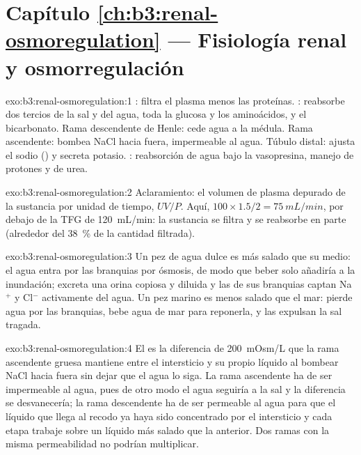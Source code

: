 \section*{Capítulo \ref{ch:b3:renal-osmoregulation} --- Fisiología renal y osmorregulación}

\begin{solution}{exo:b3:renal-osmoregulation:1}
: filtra el plasma menos las proteínas. :
reabsorbe dos tercios de la sal y del agua, toda la glucosa y los
aminoácidos, y el bicarbonato. Rama descendente de Henle: cede agua a
la médula. Rama ascendente: bombea NaCl hacia fuera, impermeable al
agua. Túbulo distal: ajusta el sodio () y secreta potasio.
: reabsorción de agua bajo la vasopresina, manejo de
protones y de urea.
\end{solution}

\begin{solution}{exo:b3:renal-osmoregulation:2}
Aclaramiento: el volumen de plasma depurado de la sustancia por unidad
de tiempo, $UV/P$. Aquí, $100\times 1.5/2 = \qty{75}{mL/min}$, por
debajo de la TFG de \qty{120}{mL/min}: la sustancia se filtra y se
reabsorbe en parte (alrededor del \qty{38}{\%} de la cantidad
filtrada).
\end{solution}

\begin{solution}{exo:b3:renal-osmoregulation:3}
Un pez de agua dulce es más salado que su medio: el agua entra por las
branquias por ósmosis, de modo que beber solo añadiría a la inundación;
excreta una orina copiosa y diluida y las  de sus
branquias captan Na$^{+}$ y Cl$^{-}$ activamente del agua. Un pez
marino es menos salado que el mar: pierde agua por las branquias, bebe
agua de mar para reponerla, y las  expulsan la sal
tragada.
\end{solution}

\begin{solution}{exo:b3:renal-osmoregulation:4}
El  es la diferencia de \qty{200}{mOsm/L} que la rama
ascendente gruesa mantiene entre el intersticio y su propio líquido al
bombear NaCl hacia fuera sin dejar que el agua lo siga. La rama
ascendente ha de ser impermeable al agua, pues de otro modo el agua
seguiría a la sal y la diferencia se desvanecería; la rama descendente
ha de ser permeable al agua para que el líquido que llega al recodo ya
haya sido concentrado por el intersticio y cada etapa trabaje sobre un
líquido más salado que la anterior. Dos ramas con la misma
permeabilidad no podrían multiplicar.
\end{solution}

